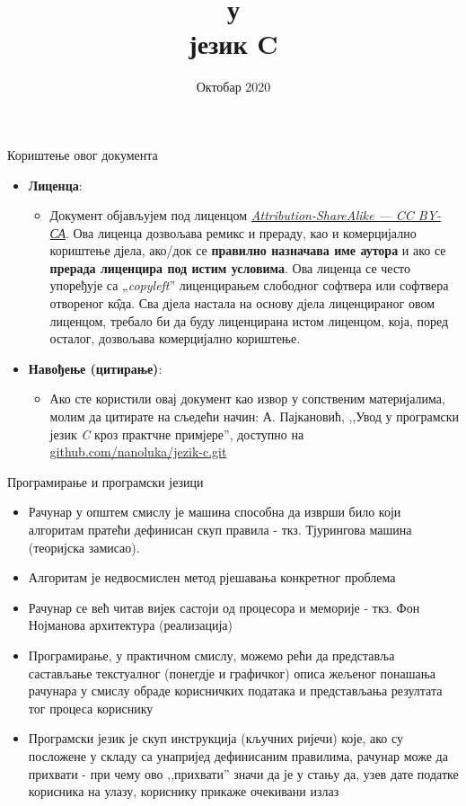 \documentclass{beamer}
\title[Програмски језик C - основи]{\color{black}\smallУвод у \\\color{orange}\normalsizeПрограмски језик C}
\institute{\texttt{nanoluka.org}\\
YouTube.com/nanoluka\\
instagram.com/nanolukaorg\\
twitter.com/nanolukaorg\\
github.com/nanoluka\\
\texttt{nanolukaorg@gmail.com}}
\date{\color{orange}Октобар 2020}
\begin{document}
\maketitle

\begin{frame}{Кориштење овог документа}
\begin{itemize}
    \item \textbf{Лиценца}: 
    \begin{itemize}
        \item Документ објављујем под лиценцом \color{orange}\href{https://creativecommons.org/licenses/by-sa/4.0//legalcode}{\textit{Attribution-ShareAlike — CC BY-СА}}\color{black}. Ова лиценца дозвољава ремикс и прераду, као и комерцијално кориштење дјела, ако/док се \textbf{правилно назначава име аутора} и ако се \textbf{прерада лиценцира под истим условима}. Ова лиценца се често упоређује са „\textit{copyleft}” лиценцирањем слободног софтвера или софтвера отвореног к\^{о}да. Сва дјела настала на основу дјела лиценцираног овом лиценцом, требало би да буду лиценцирана истом лиценцом, која, поред осталог, дозвољава комерцијално кориштење.
    \end{itemize}
    \item \textbf{Навођење (цитирање)}: 
    \begin{itemize}
        \item Ако сте користили овај документ као извор у сопственим материјалима, молим да цитирате на сљедећи начин: А. Пајкановић, ,,Увод у програмски језик \textit{C} кроз практчне примјере'', доступно на \color{orange}\href{github.com/nanoluka/jezik-c.git}{github.com/nanoluka/jezik-c.git}
    \end{itemize}
\end{itemize}
\end{frame}



\begin{frame}{Програмирање и програмски језици}
\begin{itemize}
    \item Рачунар у општем смислу је машина способна да изврши било који алгоритам пратећи дефинисан скуп правила - ткз. Тјурингова машина (теоријска замисао).
    \item Алгоритам је недвосмислен метод рјешавања конкретног проблема
    \item Рачунар се већ читав вијек састоји од процесора и меморије - ткз. Фон Нојманова архитектура (реализација)
    \item Програмирање, у практичном смислу, можемо рећи да представља састављање текстуалног (понегдје и графичког) описа жељеног понашања рачунара у смислу обраде корисничких података и представљања резултата тог процеса кориснику
    \item Програмски језик је скуп инструкција (кључних ријечи) које, ако су посложене у складу са унапријед дефинисаним правилима, рачунар може да прихвати - при чему ово ,,прихвати'' значи да је у стању да, узев дате податке корисника на улазу, кориснику прикаже очекивани излаз
\end{itemize}
\end{frame}
\end{document}
